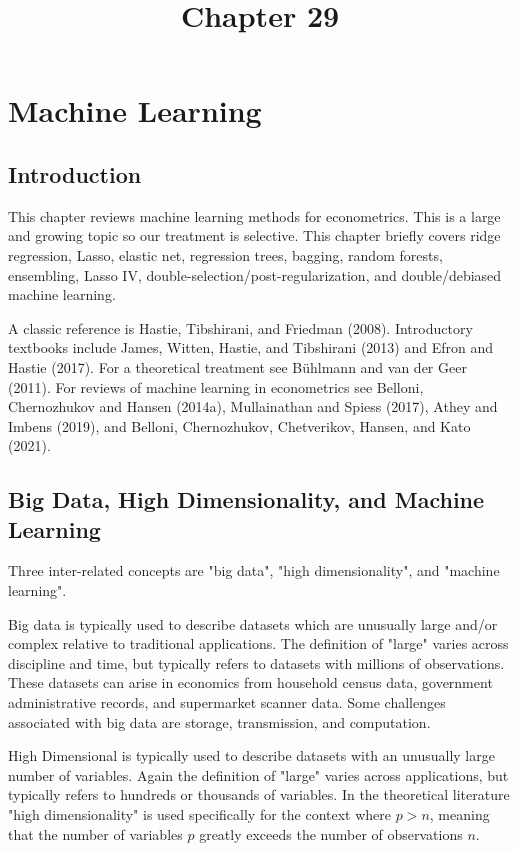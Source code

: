 \documentclass[10pt]{article}
\title{Chapter 29 }
\author{}
\date{}
\begin{document}
\maketitle
\section{Machine Learning}
\subsection{Introduction}
This chapter reviews machine learning methods for econometrics. This is a large and growing topic so our treatment is selective. This chapter briefly covers ridge regression, Lasso, elastic net, regression trees, bagging, random forests, ensembling, Lasso IV, double-selection/post-regularization, and double/debiased machine learning.

A classic reference is Hastie, Tibshirani, and Friedman (2008). Introductory textbooks include James, Witten, Hastie, and Tibshirani (2013) and Efron and Hastie (2017). For a theoretical treatment see Bühlmann and van der Geer (2011). For reviews of machine learning in econometrics see Belloni, Chernozhukov and Hansen (2014a), Mullainathan and Spiess (2017), Athey and Imbens (2019), and Belloni, Chernozhukov, Chetverikov, Hansen, and Kato (2021).

\subsection{Big Data, High Dimensionality, and Machine Learning}
Three inter-related concepts are "big data", "high dimensionality", and "machine learning".

Big data is typically used to describe datasets which are unusually large and/or complex relative to traditional applications. The definition of "large" varies across discipline and time, but typically refers to datasets with millions of observations. These datasets can arise in economics from household census data, government administrative records, and supermarket scanner data. Some challenges associated with big data are storage, transmission, and computation.

High Dimensional is typically used to describe datasets with an unusually large number of variables. Again the definition of "large" varies across applications, but typically refers to hundreds or thousands of variables. In the theoretical literature "high dimensionality" is used specifically for the context where $p>n$, meaning that the number of variables $p$ greatly exceeds the number of observations $n$.
\end{document}
